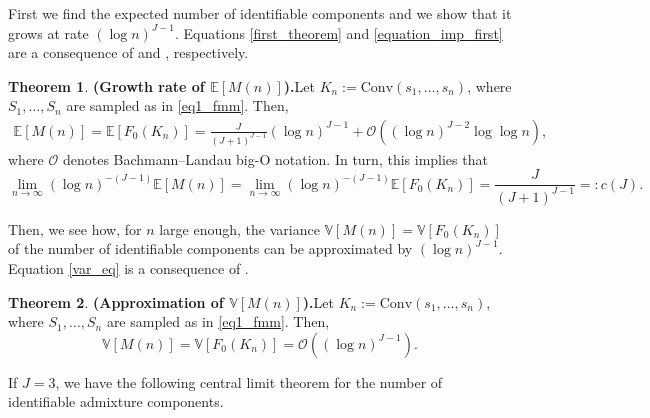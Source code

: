 \documentclass[12pt, reqno]{amsart}
\theoremstyle{definition}
\newtheorem{theorem}{Theorem}%
\begin{document}
First we find the expected number of identifiable components and we show that it grows at rate $(\log n)^{J-1}$. Equations \eqref{first_theorem} and \eqref{equation_imp_first} are a consequence of \cite[Theorem 6]{reitzner} and \cite[Theorem 5]{barany2}, respectively.

\begin{theorem}{\textbf{(Growth rate of $\mathbb{E}[M(n)]$).}}\label{growth}
Let $K_n :=\text{Conv}({s}_1,\ldots,{s}_{n})$, where ${S}_1,\ldots,{S}_{n}$ are sampled as in \eqref{eq1_fmm}. Then,
\begin{align}\label{first_theorem}
\mathbb{E}[M(n)] = \mathbb{E} \left[F_0(K_n)\right] = \frac{J}{(J+1)^{J-1}}  (\log n)^{J-1} + \mathcal{O}\left((\log n)^{J-2}\log\log n\right),
\end{align}
where $\mathcal{O}$ denotes Bachmann–Landau big-O notation.
In turn, this implies that
\begin{equation}\label{equation_imp_first}
    \lim_{n \rightarrow \infty} (\log n)^{-(J-1)}\mathbb{E} \left[M(n)\right] = \lim_{n \rightarrow \infty} (\log n)^{-(J-1)}\mathbb{E} \left[F_0(K_n)\right] = \frac{J}{(J+1)^{J-1}}  =: c(J).
\end{equation}
\end{theorem}



Then, we see how, for $n$ large enough, the variance $\mathbb{V}[M(n)]=\mathbb{V}[F_0(K_n)]$ of the number of identifiable components can be approximated by $(\log n)^{J-1}$. Equation \eqref{var_eq} is a consequence of \cite[Theorem 1.3]{reitzner_var}.


\begin{theorem}{\textbf{(Approximation of $\mathbb{V}[M(n)]$).}}\label{var_thm}
Let $K_n :=\text{Conv}({s}_1,\ldots,{s}_{n})$, where ${S}_1,\ldots,{S}_{n}$ are sampled as in \eqref{eq1_fmm}. Then, 
\begin{equation}\label{var_eq}
    \mathbb{V}[M(n)]=\mathbb{V}[F_0(K_n)]=\mathcal{O}\left( (\log n)^{J-1} \right).
\end{equation}
\end{theorem}



If $J=3$, we have the following central limit theorem for the number of identifiable admixture components. 
\end{document}
